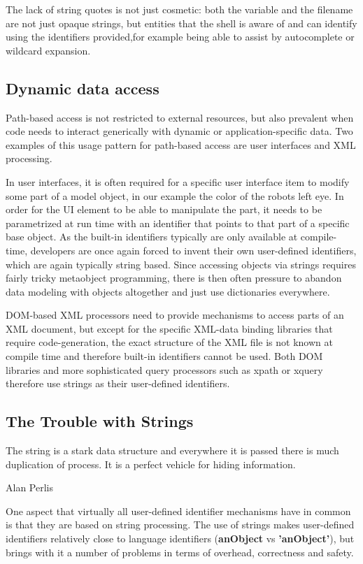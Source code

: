 \documentclass[preprint,authoryear]{acm_proc_article-sp}
\begin{document}
The lack of string quotes is not just cosmetic: both the variable and the filename
are not just opaque strings, but entities that the shell is aware of and can identify
using the identifiers provided,for example being able to assist by autocomplete 
or wildcard expansion.



\subsection{Dynamic data access}

Path-based access is not restricted to external resources, but also
prevalent when code needs to interact generically with dynamic
or application-specific data.   Two examples of this usage pattern
 for path-based access are user interfaces and XML processing.

In user interfaces, it is often required for
a specific user interface item to modify some part of a model object, in our
example the color of the robots left eye.  In order for the UI element to be
able to manipulate the part, it needs to be parametrized at run time with
an identifier that points to that part of a specific base object.   As the built-in
 identifiers typically are only available at compile-time, developers are
 once again forced to invent their own user-defined identifiers, which are again 
 typically string based.  Since accessing objects via strings requires fairly tricky
 metaobject programming, there is then often pressure to abandon data
 modeling with objects altogether and just use dictionaries everywhere.

DOM-based XML processors need to provide mechanisms to access parts of
an XML document, but except for the specific XML-data binding libraries that
require code-generation, the exact structure of the XML file is not known at 
compile time and therefore built-in identifiers cannot be used.  Both DOM libraries
and more sophisticated query processors such as xpath or xquery therefore use
strings as their user-defined identifiers.


\subsection{The Trouble with Strings}
\epigraph{The string is a stark data structure and everywhere it is passed there is much duplication of process. It is a perfect vehicle for hiding information.}{Alan Perlis}
\label{stringtrouble}

One aspect that virtually all user-defined identifier mechanisms have in common is that they
are based on string processing.  The use of strings makes user-defined identifiers relatively
close to language identifiers ({\bf \hbox{anObject}} vs {\bf \hbox{'anObject'}}), but brings with it a number of problems in terms of overhead, correctness and safety.
\end{document}
